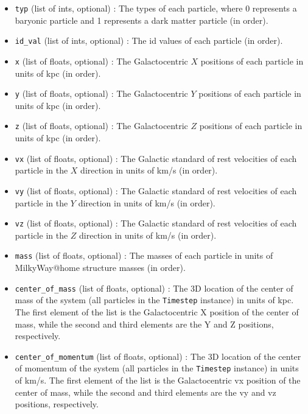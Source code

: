 \documentclass{article}
\begin{document}
\begin{itemize}

\item \verb!typ! (list of ints, optional) : The types of each particle, where 0 represents a baryonic particle and 1 represents a dark matter particle (in order).

\item \verb!id_val! (list of ints, optional) : The id values of each particle (in order).

\item \verb!x! (list of floats, optional) : The Galactocentric $X$ positions of each particle in units of kpc (in order).

\item \verb!y! (list of floats, optional) : The Galactocentric $Y$ positions of each particle in units of kpc (in order).

\item \verb!z! (list of floats, optional) : The Galactocentric $Z$ positions of each particle in units of kpc (in order).

\item \verb!vx! (list of floats, optional) : The Galactic standard of rest velocities of each particle in the $X$ direction in units of km/s (in order).

\item \verb!vy! (list of floats, optional) : The Galactic standard of rest velocities of each particle in the $Y$ direction in units of km/s (in order).

\item \verb!vz! (list of floats, optional) : The Galactic standard of rest velocities of each particle in the $Z$ direction in units of km/s (in order).

\item \verb!mass! (list of floats, optional) : The masses of each particle in units of MilkyWay@home structure masses (in order).

\item \verb!center_of_mass! (list of floats, optional) : The 3D location of the center of mass of the system (all particles in the \verb!Timestep! instance) in units of kpc. The first element of the list is the Galactocentric X position of the center of mass, while the second and third elements are the Y and Z positions, respectively.

\item \verb!center_of_momentum! (list of floats, optional) : The 3D location of the center of momentum of the system (all particles in the \verb!Timestep! instance) in units of km/s. The first element of the list is the Galactocentric vx position of the center of mass, while the second and third elements are the vy and vz positions, respectively.


\end{itemize}
\end{document}
